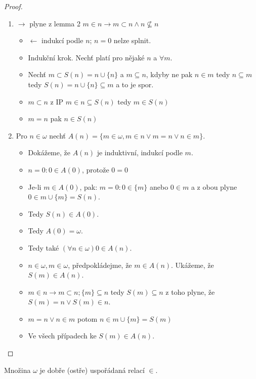 \begin{proof}
	\begin{enumerate}
		\item $\rightarrow$ plyne z lemma 2 $m \in n \rightarrow m \subset n \land n \nsubseteq n$
		\begin{itemize}
			\item $\leftarrow$ indukcí podle $n$; $n = 0$ nelze splnit.
			\item Indukční krok. Nechť platí pro nějaké $n$ a $\forall m$.
			\item Nechť $m \subset S(n) = n \cup \{n\}$ a $m \subseteq n$, kdyby ne pak $n \in m$ tedy $n \subseteq m$ tedy $S(n) = n \cup \{n\} \subseteq m$ a to je spor.
			\item $m \subset n$ z IP $m \in n \subseteq S(n)$ tedy $m \in S(n)$
			\item $m = n$ pak $n \in S(n)$
		\end{itemize} 
		\item Pro $n \in \omega$ nechť $A(n) = \{m \in \omega, m \in n \lor m =n \lor n \in m\}$.
		\begin{itemize}
			\item Dokážeme, že $A(n)$ je induktivní, indukcí podle $m$.
			\item $n = 0: 0 \in A(0)$, protože $0 = 0$
			\item Je-li $m \in A(0)$, pak: $m = 0: 0 \in \{m\}$ anebo $0 \in m$ a z obou plyne $0 \in m \cup \{m\} = S(n)$.
			\item Tedy $S(n) \in A(0)$.
			\item Tedy $A(0) = \omega$.
			\item Tedy také $(\forall n \in \omega) 0 \in A(n)$.
			\item $n \in \omega, m \in \omega$, předpokládejme, že $m \in A(n)$. Ukážeme, že $S(m) \in A(n)$.
			\item $m \in n \rightarrow m \subset n; \{m\} \subseteq n$ tedy $S(m) \subseteq n$ z toho plyne, že $S(m) = n \lor S(m) \in n$.
			\item $m = n \lor n \in m$ potom $n \in m \cup \{m\} = S(m)$
			\item Ve všech případech ke $S(m) \in A(n)$.
		\end{itemize}
	\end{enumerate}
\end{proof}

\begin{thm}
	Množina $\omega$ je dobře (ostře) uspořádaná relací $\in$.
\end{thm}

